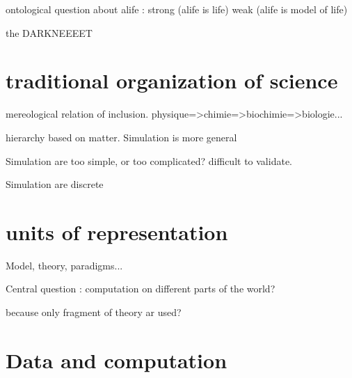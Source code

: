 ontological question about alife : strong (alife is life) weak (alife is model of life)

the DARKNEEEET


\section{traditional organization of science}

mereological relation of inclusion.
physique=>chimie=>biochimie=>biologie...

hierarchy based on matter. Simulation is more general


Simulation are too simple, or too complicated? difficult to validate.

Simulation are discrete

\section{units of representation}
Model, theory, paradigms...


Central question : computation on different parts of the world?


because only fragment of theory ar used?

\section{Data and computation}


